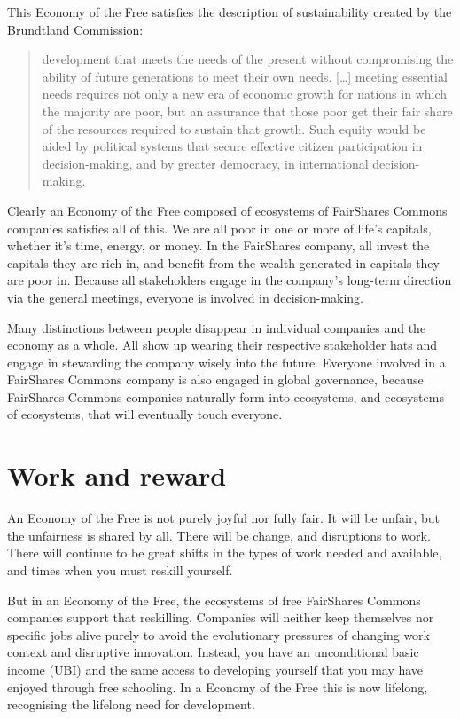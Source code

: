 This Economy of the Free satisfies the description of sustainability created by the Brundtland Commission:


\begin{quote}
development that meets the needs of the present without compromising the ability of future generations to meet their own needs. [\ldots] meeting essential needs requires not only a new era of economic growth for nations in which the majority are poor, but an assurance that those poor get their fair share of the resources required to sustain that growth. Such equity would be aided by political systems that secure effective citizen participation in decision-making, and by greater democracy, in international decision-making\cite{wced-sustainability}.
\end{quote}


Clearly an Economy of the Free  composed of ecosystems of FairShares Commons companies satisfies all of this. We are all poor in one or more of life’s capitals, whether it's time, energy, or money. In the FairShares company, all invest the capitals they are rich in, and benefit from the wealth  generated in capitals  they are poor in. Because all stakeholders  engage in the company’s long-term direction via the general meetings, everyone is involved in decision-making.


Many distinctions between people disappear in individual companies and the economy as a whole. All show up wearing their respective stakeholder hats and engage in stewarding the company wisely into the future. Everyone involved in a FairShares Commons  company is also engaged in global governance, because FairShares Commons companies naturally form into ecosystems, and ecosystems of ecosystems, that will eventually touch everyone. 
\section{Work and reward}
\label{section:ubi}
An Economy of the Free  is not purely joyful nor fully fair. It will be unfair, but the unfairness is shared by all. There will be change, and disruptions to work.  There will continue to be great shifts in the types of work needed and available, and times when you must reskill yourself.


But in an Economy of the Free, the ecosystems of free FairShares Commons  companies support that reskilling. Companies will neither keep themselves nor specific jobs alive purely to avoid the evolutionary pressures of changing work context and disruptive innovation. Instead, you have an unconditional basic income (UBI)  and the same access to developing yourself that you may have enjoyed through free schooling. In a Economy of the Free this is now lifelong, recognising the lifelong need for development.


